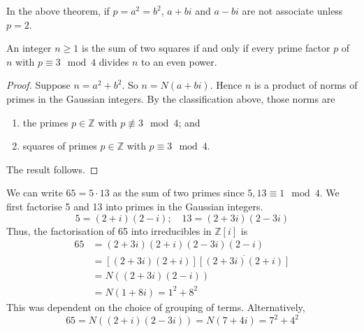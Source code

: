 \begin{remark}
	In the above theorem, if \( p = a^2 = b^2 \), \( a+bi \) and \( a-bi \) are not associate unless \( p = 2 \).
\end{remark}
\begin{corollary}
	An integer \( n \geq 1 \) is the sum of two squares if and only if every prime factor \( p \) of \( n \) with \( p \equiv 3 \mod 4 \) divides \( n \) to an even power.
\end{corollary}
\begin{proof}
	Suppose \( n = a^2 + b^2 \).
	So \( n = N(a+bi) \).
	Hence \( n \) is a product of norms of primes in the Gaussian integers.
	By the classification above, those norms are
	\begin{enumerate}
		\item the primes \( p \in \mathbb Z \) with \( p \not\equiv 3 \mod 4 \); and
		\item squares of primes \( p \in \mathbb Z \) with \( p \equiv 3 \mod 4 \).
	\end{enumerate}
	The result follows.
\end{proof}
\begin{example}
	We can write \( 65 = 5 \cdot 13 \) as the sum of two primes since \( 5, 13 \equiv 1 \mod 4 \).
	We first factorise 5 and 13 into primes in the Gaussian integers.
	\[
		5 = (2+i)(2-i);\quad 13 = (2+3i)(2-3i)
	\]
	Thus, the factorisation of 65 into irreducibles in \( \mathbb Z[i] \) is
	\begin{align*}
		65 & = (2+3i)(2+i)(2-3i)(2-i)                \\
		   & = [(2+3i)(2+i)]\overline{[(2+3i)(2+i)]} \\
		   & = N((2+3i)(2-i))                        \\
		   & = N(1+8i) = 1^2 + 8^2
	\end{align*}
	This was dependent on the choice of grouping of terms.
	Alternatively,
	\[
		65 = N((2+i)(2-3i)) = N(7+4i) = 7^2 + 4^2
	\]
\end{example}

